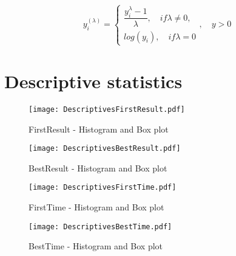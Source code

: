 \begin{equation}
y_i^{(\lambda)} = \begin{cases}
\dfrac{y_i^{\lambda}-1}{\lambda}, \quad if \lambda \neq 0, \\ 
log(y_i), \quad if \lambda = 0
\end{cases}, \quad y > 0 
\end{equation}


\section{Descriptive statistics}
		\label{Appendix-Descriptive}
		
\begin{figure}[htbp] %
\begin{center} 
\texttt{[image: DescriptivesFirstResult.pdf]}
  \caption{FirstResult - Histogram and Box plot}
    \label{DistributionFirstResult} 
\end{center}
\end{figure}

\begin{figure}[htbp] %
\begin{center} 
\texttt{[image: DescriptivesBestResult.pdf]}
  \caption{BestResult - Histogram and Box plot}
    \label{DistributionBestResult} 
\end{center}
\end{figure}

\begin{figure}[htbp] %
\begin{center} 
\texttt{[image: DescriptivesFirstTime.pdf]}
  \caption{FirstTime - Histogram and Box plot}
    \label{DistributionFirstTime} 
\end{center}
\end{figure}
\begin{figure}[htbp] %
\begin{center} 
\texttt{[image: DescriptivesBestTime.pdf]}
  \caption{BestTime - Histogram and Box plot}
    \label{DistributionBestTime} 
\end{center}
\end{figure}

